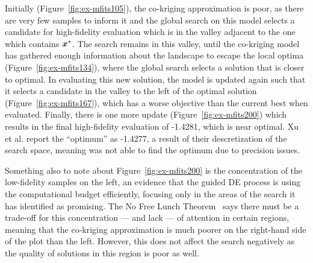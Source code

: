 Initially (Figure~\ref{fig:ex-mfits105}), the co-kriging approximation is poor, as there are very few samples to inform it and the global search on this model selects a candidate for high-fidelity evaluation which is in the valley adjacent to the one which contains $\boldsymbol{x}^*$. The search remains in this valley, until the co-kriging model has gathered enough information about the landscape to escape the local optima (Figure~\ref{fig:ex-mfits134}), where the global search selects a solution that is closer to optimal. In evaluating this new solution, the model is updated again such that it selects a candidate in the valley to the left of the optimal solution (Figure~\ref{fig:ex-mfits167}), which has a worse objective than the current best when evaluated. Finally, there is one more update (Figure~\ref{fig:ex-mfits200}) which results in the final high-fidelity evaluation of -1.4281, which is near optimal. Xu et al. report the ``optimum'' as -1.4277, a result of their descretization of the search space, meaning \motos{} was not able to find the optimum due to precision issues.

Something also to note about Figure~\ref{fig:ex-mfits200} is the concentration of the low-fidelity samples on the left, an evidence that the guided DE process is using the computational budget efficiently, focusing only in the areas of the search it has identified as promising. The No Free Lunch Theorem~\cite{wolpert1997no} says there must be a trade-off for this concentration --- and lack --- of attention in certain regions, meaning that the co-kriging approximation is much poorer on the right-hand side of the plot than the left. However, this does not affect the search negatively as the quality of solutions in this region is poor as well.